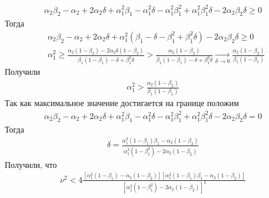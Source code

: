 \documentclass[a4paper,14pt]{extarticle} %
\begin{document}
 \begin{equation}
 \begin{aligned}
\alpha_2\beta_2 - \alpha_2 + 2\alpha_2\delta + \alpha_1^2\beta_1 - \alpha_1^2\delta - \alpha_1^2\beta_1^2 + \alpha_1^2\beta_1^2\delta - 2\alpha_2\beta_2\delta \geq 0
 \end{aligned}
\end{equation}
Тогда
 \begin{equation}
 \begin{aligned}
&\alpha_2\beta_2 - \alpha_2 + 2\alpha_2\delta + \alpha_1^2(\beta_1 - \delta - \beta_1^2 + \beta_1^2\delta) - 2\alpha_2\beta_2\delta \geq 0 \\
&\alpha_1^2 \geq \frac{\alpha_2(1-\beta_2) - 2\alpha_2\delta(1-\beta_2)}{\beta_1(1-\beta_1) - \delta + \beta_1^2\delta} > \frac{\alpha_2(1-\beta_2)}{\beta_1(1-\beta_1) - \delta + \beta_1^2\delta} \xrightarrow[\delta \rightarrow 0]{} \frac{\alpha_2(1-\beta_2)}{\beta_1(1-\beta_1)}
 \end{aligned}
\end{equation}
Получили
 \begin{equation}
 \begin{aligned}
\alpha_1^2 > \frac{\alpha_2(1-\beta_2)}{\beta_1(1-\beta_1)}
 \end{aligned}
\end{equation}
Так как максимальное значение достигается на границе положим 
 \begin{equation}
 \begin{aligned}
\alpha_2\beta_2 - \alpha_2 + 2\alpha_2\delta + \alpha_1^2\beta_1 - \alpha_1^2\delta - \alpha_1^2\beta_1^2 + \alpha_1^2\beta_1^2\delta - 2\alpha_2\beta_2\delta = 0
 \end{aligned}
\end{equation}
Тогда 
 \begin{equation}
 \begin{aligned}
\delta = \frac{\alpha_1^2(1-\beta_1)\beta_1 - \alpha_2(1-\beta_2)}{\alpha_1^2(1-\beta_1^2) - 2\alpha_2(1-\beta_2)}
 \end{aligned}
 \end{equation}
Получили, что
 \begin{equation}
 \begin{aligned}
\nu^2 < 4\frac{[\alpha_1^2(1-\beta_1) - \alpha_2(1-\beta_2)][\alpha_1^2(1-\beta_1)\beta_1 - \alpha_2(1-\beta_2)]}{[\alpha_1^2(1-\beta_1^2) - 2\alpha_2(1-\beta_2)]^2}
 \end{aligned}
 \end{equation}
\end{document}
